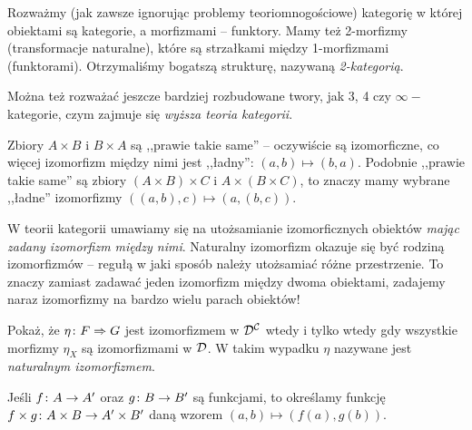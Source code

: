 \begin{remk}
  Rozważmy (jak zawsze ignorując problemy teoriomnogościowe) kategorię w której obiektami są kategorie, a morfizmami -- funktory. Mamy też 2-morfizmy (transformacje naturalne), które są strzałkami między 1-morfizmami (funktorami). Otrzymaliśmy bogatszą strukturę, nazywaną \emph{2-kategorią}.

  Można też rozważać jeszcze bardziej rozbudowane twory, jak 3, 4 czy $\infty-$kategorie, czym zajmuje się \emph{wyższa teoria kategorii}.
\end{remk}

\begin{idea}
  \label{idea:prawie_takie_same}
  Zbiory $A\times B$ i $B\times A$ są ,,prawie takie same'' -- oczywiście są izomorficzne, co więcej izomorfizm między nimi jest ,,ładny'': $(a, b)\mapsto (b, a)$. Podobnie ,,prawie takie same'' są zbiory $(A\times B)\times C$ i $A\times (B\times C)$, to znaczy mamy wybrane ,,ładne'' izomorfizmy $((a, b), c)\mapsto (a, (b, c))$.

  W teorii kategorii umawiamy się na utożsamianie izomorficznych obiektów \emph{mając zadany izomorfizm między nimi}. Naturalny izomorfizm okazuje się być rodziną izomorfizmów -- regułą w jaki sposób należy utożsamiać różne przestrzenie. To znaczy zamiast zadawać jeden izomorfizm między dwoma obiektami, zadajemy naraz izomorfizmy na bardzo wielu parach obiektów!
\end{idea}

\begin{exc}
  Pokaż, że $\eta\colon F\Rightarrow G$ jest izomorfizmem w $\mathcal D^\mathcal C$ wtedy i tylko wtedy gdy wszystkie morfizmy $\eta_X$ są izomorfizmami w $\mathcal D$. W takim wypadku $\eta$ nazywane jest \emph{naturalnym izomorfizmem}.
\end{exc}

\begin{nott}
  Jeśli $f\colon A\to A'$ oraz $g\colon B\to B'$ są funkcjami, to określamy funkcję $f\times g\colon A\times B\to A'\times B'$ daną wzorem $(a, b)\mapsto (f(a), g(b))$.
\end{nott}

